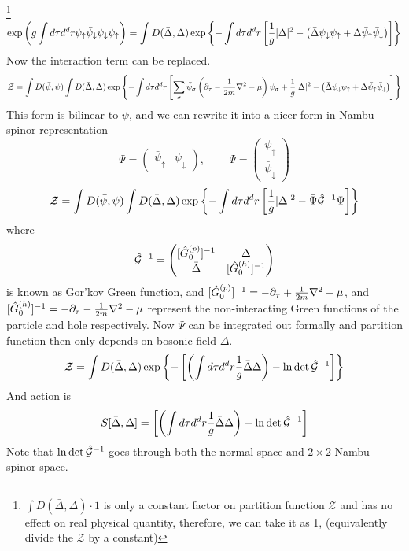 \footnote{$\int{D(\bar\Delta,\Delta)}\cdot1$ is only a constant factor on partition function $\mathcal{Z}$ and has no effect on real physical quantity, therefore, we can take it as 1, (equivalently divide the $\mathcal{Z}$ by a constant)}
\begin{equation}
\exp\left(g\int{d\tau{}d^{d}r}\psi_{\uparrow}\bar\psi_{\downarrow}\psi_{\downarrow}\psi_{\uparrow}\right)=
\int{D(\bar\Delta,\Delta)}\exp\left\{-\int{d\tau{d^{d}r}}\left[\frac{1}{g}\lvert{\Delta}\rvert^{2}-\left(\bar\Delta\psi_{\downarrow}\psi_{\uparrow}+\Delta\bar\psi_{\uparrow}\bar\psi_{\downarrow}\right)\right]\right\}
\end{equation}
Now the interaction term can be replaced.
\begin{equation*}
\mathcal{Z}=\int{D(\bar\psi,\psi)\int{D(\bar\Delta,\Delta)}\exp\ensuremath{\left\{-\int{d\tau{d^{d}r}}\left[\sum_{\sigma}\bar\psi_{\sigma}\left(\partial_{\tau}-\frac{1}{2m}\nabla^{2}-\mu\right)\psi_{\sigma}+\frac{1}{g}\lvert{\Delta}\rvert^{2}-\left(\bar\Delta\psi_{\downarrow}\psi_{\uparrow}+\Delta\bar\psi_{\uparrow}\bar\psi_{\downarrow}\right)\right]\right\}}}
\end{equation*}
This form is bilinear to $\psi$, and we can rewrite it into a nicer form in Nambu spinor representation
\begin{equation}
\bar\Psi=\begin{pmatrix}\bar{\psi}_{\uparrow}&\psi_{\downarrow}\end{pmatrix}\text{,  }\qquad
\Psi=\begin{pmatrix}{\psi}_{\uparrow}\\\bar\psi_{\downarrow}\end{pmatrix}
\end{equation}
\begin{equation}
\mathcal{Z}=\int{D(\bar\psi,\psi)}\int{D(\bar\Delta,\Delta)}\exp
	\left\{-\int{d\tau{d^{d}r}}\left[\frac{1}{g}\lvert{\Delta}\rvert^{2}-\bar\Psi \hat{\mathcal{G}}^{-1}\Psi\right]\right\}
\end{equation}
where 
\begin{equation}\label{eq:pathInt:nG}
\hat{\mathcal{G}}^{-1}=\begin{pmatrix}
[\hat{G}_{0}^{(p)}]^{-1}&\Delta\\\bar\Delta&[\hat{G}_{0}^{(h)}]^{-1}
\end{pmatrix}
\end{equation}
is known as Gor'kov Green function, and $[\hat{G}_{0}^{(p)}]^{-1}=-\partial_{\tau}+\frac{1}{2m}\nabla^{2}+\mu$, and $[\hat{G}_{0}^{(h)}]^{-1}=-\partial_{\tau}-\frac{1}{2m}\nabla^{2}-\mu$ represent the non-interacting Green functions of the particle and hole respectively. Now $\Psi$ can be integrated out formally and partition function then only depends on bosonic field $\Delta$.
\begin{equation}\label{eq:pathInt:DeltaPF}
\mathcal{Z}=\int{D(\bar\Delta,\Delta)}\exp
	\left\{-\left[\left(\int{d\tau{d^{d}r}}\frac{1}{g}{\bar\Delta\Delta}\right)-\ln\det\hat{\mathcal{G}}^{-1}\right]\right\}
\end{equation}
And action is
\begin{equation}\label{eq:pathInt:DeltaAction}
S[\bar\Delta,\Delta]=
	{\left[\left(\int{d\tau{d^{d}r}}\frac{1}{g}{\bar\Delta\Delta}\right)-\ln\det\hat{\mathcal{G}}^{-1}\right]}
\end{equation}
Note that $\ln\det\hat{\mathcal{G}}^{-1}$ goes through both the normal space and $2\times2$ Nambu spinor space.  

